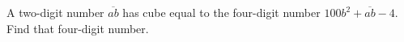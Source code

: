 A two-digit number $\overline{ab}$ has cube equal to the four-digit number $100b^2+\overline{ab}-4$. Find that four-digit number.
